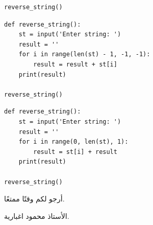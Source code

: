 \documentclass[14pt]{extarticle}
\begin{document}
\begin{enumerate}[label=\textbf{السؤال \arabic*:}, wide=0pt, itemsep=2.2em]
\begin{boxCode}
\begin{english}
\begin{verbatim}
reverse_string()
\end{verbatim}
\end{english}
\end{boxCode}

\ifwithsols
\begin{boxSolution}
\begin{english}
\begin{verbatim}
def reverse_string():
    st = input('Enter string: ')
    result = ''
    for i in range(len(st) - 1, -1, -1):
        result = result + st[i]
    print(result)

reverse_string()
\end{verbatim}
\end{english}
\end{boxSolution}

\filbreak

\begin{boxSolution}
\begin{english}
\begin{verbatim}
def reverse_string():
    st = input('Enter string: ')
    result = ''
    for i in range(0, len(st), 1):
        result = st[i] + result
    print(result)

reverse_string()
\end{verbatim}
\end{english}
\end{boxSolution}
\fi
\filbreak

\end{enumerate}

\vspace{1cm}
\begin{flushleft}
أرجو لكم وقتًا ممتعًا.

الأستاذ محمود اغبارية.
\end{flushleft}
\end{document}
